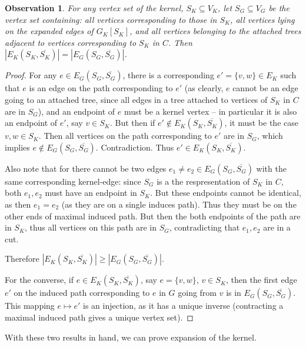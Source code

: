 \documentclass[11pt]{article}
\theoremstyle{plain}
\newtheorem{observation}[theorem]{Observation}
\newcommand{\1}{\mathbb{1}}
\begin{document}
\begin{observation}\label{obs:cuts-are-preserved}
    For any vertex set of the kernel, \(S_K\subseteq V_K\), let \(S_G\subseteq V_G\) be the vertex set containing: all vertices corresponding to those in \(S_K\), all vertices lying on the expanded edges of \(G_K[S_K]\), and all vertices belonging to the attached trees adjacent to vertices corresponding to \(S_K\) in \(C\). Then \(|E_K(S_K,\overline{S_K})| = |E_G(S_G,\overline{S_G})|\).
\end{observation}
\begin{proof}
    For any \(e\in E_G(S_G,\overline{S_G})\), there is a corresponding \(e'=\{v,w\}\in E_K\) such that \(e\) is an edge on the path corresponding to \(e'\) (as clearly, \(e\) cannot be an edge going to an attached tree, since all edges in a tree attached to vertices of \(S_K\) in \(C\) are in \(S_G\)), and an endpoint of \(e\) must be a kernel vertex -- in particular it is also an endpoint of \(e'\), say \(v\in S_K\). But then if \(e'\not\in E_K(S_K,\overline{S_K})\), it must be the case \(v,w\in S_K\). Then all vertices on the path corresponding to \(e'\) are in \(S_G\), which implies \(e\not\in E_G(S_G,\overline{S_G})\). Contradiction. Thus \(e'\in E_K(S_K,\overline{S_K})\).
    
    Also note that for there cannot be two edges \(e_1\neq e_2\in E_G(S_G,\overline{S_G})\) with the same corresponding kernel-edge: since \(S_G\) is a the respresentation of \(S_K\) in \(C\), both \(e_1,e_2\) must have an endpoint in \(S_K\). But these endpoints cannot be identical, as then \(e_1 = e_2\) (as they are on a single induces path). Thus they must be on the other ends of maximal induced path. But then the both endpoints of the path are in \(S_K\), thus all vertices on this path are in \(S_G\), contradicting that \(e_1,e_2\) are in a cut.

    Therefore \(|E_K(S_K,\overline{S_K})|\geq |E_G(S_G,\overline{S_G})|\).

    For the converse, if \(e\in E_K(S_K,\overline{S_K})\), say \(e = \{v,w\}\), \(v\in S_K\), then the first edge \(e'\) on the induced path corresponding to \(e\) in \(G\) going from \(v\) is in \(E_G(S_G,\overline{S_G})\). This mapping \(e\mapsto e'\) is an injection, as it has a unique inverse (contracting a maximal induced path gives a unique vertex set).
\end{proof}

With these two results in hand, we can prove expansion of the kernel.
\end{document}
